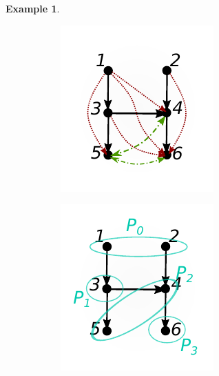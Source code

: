 \documentclass{statsoc}
\newtheorem{example}{Example}
\begin{document}
\begin{example}
\begin{figure}
    \begin{subfigure}[b]{0.45\textwidth}
      \includegraphics[width=\linewidth]{example_algorithm.pdf}
    \end{subfigure}
    \begin{subfigure}[b]{0.45\textwidth}
      \includegraphics[width=\linewidth]{example_algorithm2.pdf}
    \end{subfigure}
  \end{figure}


\end{example}
\end{document}
